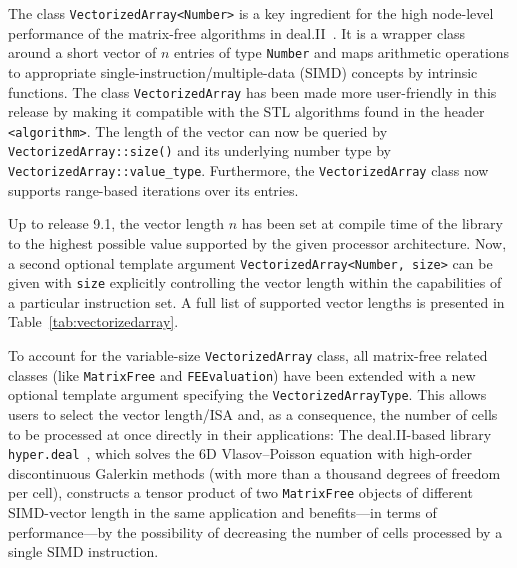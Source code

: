 \documentclass{ansarticle-preprint}
\begin{document}
The class \texttt{VectorizedArray<Number>} is a key ingredient for the high
node-level performance of the matrix-free algorithms in deal.II~\cite{KronbichlerKormann2012, KronbichlerKormann2019}. It is a wrapper
class around a short vector of $n$ entries of type \texttt{Number} and maps
arithmetic operations to appropriate single-instruction/multiple-data (SIMD)
concepts by intrinsic functions.
The class \texttt{VectorizedArray} has been made more user-friendly in this release by making
it compatible with the STL algorithms found in the header \texttt{<algorithm>}.
The length of the  vector can now be queried by  \texttt{VectorizedArray::size()} and its underlying number type by \texttt{VectorizedArray::value\_type}.
Furthermore, the \texttt{VectorizedArray} class now supports range-based iterations over its entries.

Up to release 9.1, the
vector length $n$ has been set at compile time of the library to the highest
possible value supported by the given processor architecture.
Now, a second optional template argument
\texttt{VectorizedArray<Number, size>} can be given with \texttt{size} explicitly controlling
the vector length within the capabilities of a particular instruction set.
A full list of supported
vector lengths is presented in Table~\ref{tab:vectorizedarray}.

To account for the variable-size \texttt{VectorizedArray} class, all matrix-free related classes (like \texttt{MatrixFree} and \texttt{FEEvaluation})
have been extended with a new optional template argument specifying the
\texttt{VectorizedArrayType}. This allows users to select the vector length/ISA and,
as a consequence, the number of cells to be processed at once directly in their applications:
The deal.II-based
library \texttt{hyper.deal}~\cite{munch2020hyperdeal}, which solves the 6D Vlasov--Poisson equation with high-order
discontinuous Galerkin methods (with more than a thousand degrees of freedom per cell), constructs a tensor product of two \texttt{MatrixFree} objects of different SIMD-vector
length in the same application and benefits---in terms of performance---by the possibility of decreasing the number of cells processed by a single SIMD instruction.
\end{document}
